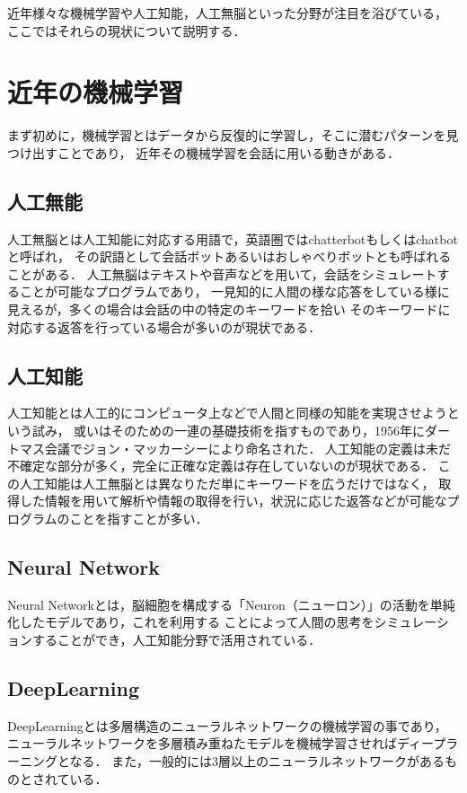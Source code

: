 近年様々な機械学習や人工知能，人工無脳といった分野が注目を浴びている，
ここではそれらの現状について説明する．

\section{近年の機械学習}
まず初めに，機械学習とはデータから反復的に学習し，そこに潜むパターンを見つけ出すことであり，
近年その機械学習を会話に用いる動きがある．

\subsection{人工無能}
人工無脳\cite{muno}とは人工知能\cite{tino}に対応する用語で，英語圏ではchatterbotもしくはchatbotと呼ばれ，
その訳語として会話ボットあるいはおしゃべりボットとも呼ばれることがある．
人工無脳はテキストや音声などを用いて，会話をシミュレートすることが可能なプログラムであり，
一見知的に人間の様な応答をしている様に見えるが，多くの場合は会話の中の特定のキーワードを拾い
そのキーワードに対応する返答を行っている場合が多いのが現状である．

\subsection{人工知能}
人工知能とは人工的にコンピュータ上などで人間と同様の知能を実現させようという試み，
或いはそのための一連の基礎技術を指すものであり，1956年にダートマス会議でジョン・マッカーシーにより命名された．
人工知能の定義は未だ不確定な部分が多く，完全に正確な定義は存在していないのが現状である．
この人工知能は人工無脳とは異なりただ単にキーワードを広うだけではなく，
取得した情報を用いて解析や情報の取得を行い，状況に応じた返答などが可能なプログラムのことを指すことが多い．

\subsection{Neural Network}
Neural Networkとは，脳細胞を構成する「Neuron（ニューロン）」の活動を単純化したモデルであり，これを利用する
ことによって人間の思考をシミュレーションすることができ，人工知能分野で活用されている．

\subsection{DeepLearning}
DeepLearning\cite{deep}とは多層構造のニューラルネットワークの機械学習の事であり，
ニューラルネットワークを多層積み重ねたモデルを機械学習させればディープラーニングとなる．
また，一般的には3層以上のニューラルネットワークがあるものとされている．

